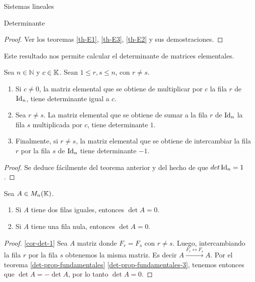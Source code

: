 \begin{chapter}{Sistemas lineales}
\begin{section}{Determinante}
\begin{teorema}
\begin{enumerate}
        \end{enumerate}
    \end{teorema}
    \begin{proof}
        Ver  los teoremas \ref{th-E1}, \ref{th-E3}, \ref{th-E2} y  sus demostraciones.
    \end{proof}

    Este resultado nos permite calcular el determinante de matrices elementales.
    
    \begin{corolario}\label{det-mtrx-elem} Sea $n \in \mathbb N$ y $c \in \mathbb K$. Sean $1 \le r,s \le n$,  con $r \ne s$.
        \begin{enumerate}
            \item Si $c \not=0$, la matriz elemental que se obtiene de multiplicar por  $c$ la fila $r$ de $\operatorname{Id}_n$, tiene determinante igual a $c$.
            \item Sea $r \ne s$. La matriz elemental que se obtiene de sumar a la fila $r$ de $\operatorname{Id}_n$  la fila $s$ multiplicada por $c$, tiene determinante $1$.
            \item Finalmente, si $r \ne s$, la matriz elemental que se obtiene de intercambiar la fila $r$ por la fila $s$ de $\operatorname{Id}_n$ tiene determinante $-1$.
        \end{enumerate}	
    \end{corolario} 
    \begin{proof}
        Se deduce fácilmente del teorema anterior y del hecho de que $det \operatorname{Id}_n =1$.			
    \end{proof}
    
    
    \begin{corolario}\label{det-filas-iguales} Sea $A  \in M_n(\mathbb K)$.
        \begin{enumerate}
            \item\label{cor-det-1} Si $A$ tiene dos filas iguales,  entonces $\det A=0$.
            \item\label{cor-det-2} Si $A$ tiene una fila nula, entonces $\det A =0$.
        \end{enumerate}
    \end{corolario}
    \begin{proof}
        \ref{cor-det-1} Sea $A$ matriz donde $F_r = F_s$ con $r\ne s$. Luego, intercambiando la fila $r$ por la fila $s$ obtenemos la misma matriz. Es decir $A  \stackrel{F_r \leftrightarrow F_s}{\longrightarrow} A$. Por el teorema \ref{det-prop-fundamentales} \ref{det-prop-fundamentales-3}, tenemos entonces que $\det A = - \det A$, por lo tanto  $\det A =0$. 
        

\end{proof}
\end{section}
\end{chapter}
